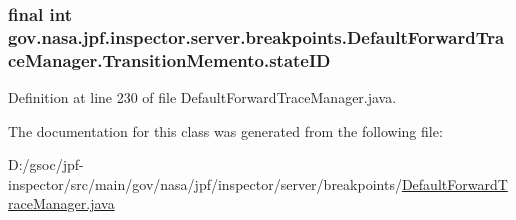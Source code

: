 \subsubsection[{\texorpdfstring{state\+ID}{stateID}}]{\setlength{\rightskip}{0pt plus 5cm}final int gov.\+nasa.\+jpf.\+inspector.\+server.\+breakpoints.\+Default\+Forward\+Trace\+Manager.\+Transition\+Memento.\+state\+ID\hspace{0.3cm}{\ttfamily [private]}}\hypertarget{classgov_1_1nasa_1_1jpf_1_1inspector_1_1server_1_1breakpoints_1_1_default_forward_trace_manager_1_1_transition_memento_aaa03f77f3bc7914487b219ab28f0e517}{}\label{classgov_1_1nasa_1_1jpf_1_1inspector_1_1server_1_1breakpoints_1_1_default_forward_trace_manager_1_1_transition_memento_aaa03f77f3bc7914487b219ab28f0e517}


Definition at line 230 of file Default\+Forward\+Trace\+Manager.\+java.



The documentation for this class was generated from the following file\+:\begin{DoxyCompactItemize}
\item 
D\+:/gsoc/jpf-\/inspector/src/main/gov/nasa/jpf/inspector/server/breakpoints/\hyperlink{_default_forward_trace_manager_8java}{Default\+Forward\+Trace\+Manager.\+java}\end{DoxyCompactItemize}
